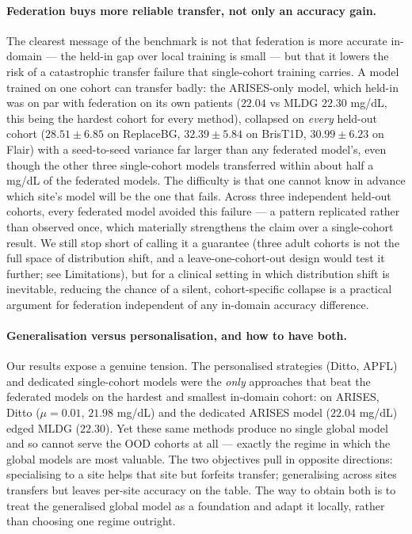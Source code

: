 \documentclass[10pt,letterpaper]{article}
\begin{document}
\paragraph{Federation buys more reliable transfer, not only an accuracy gain.}
The clearest message of the benchmark is not that federation is more accurate
in-domain --- the held-in gap over local training is small --- but that it
lowers the risk of a catastrophic transfer failure that single-cohort training
carries. A model trained on one cohort can transfer badly: the ARISES-only
model, which held-in was on par with federation on its own patients ($22.04$ vs
MLDG $22.30$ mg/dL, this being the hardest cohort for every method), collapsed on
\emph{every} held-out cohort ($28.51 \pm 6.85$ on ReplaceBG, $32.39 \pm 5.84$ on
BrisT1D, $30.99 \pm 6.23$ on Flair) with a seed-to-seed variance far larger than
any federated model's, even though the other three single-cohort models
transferred within about half a mg/dL of the federated models. The difficulty is
that one cannot know in advance which site's model will be the one that fails.
Across three independent held-out cohorts, every federated model avoided this
failure --- a pattern replicated rather than observed once, which materially
strengthens the claim over a single-cohort result. We still stop short of calling
it a guarantee (three adult cohorts is not the full space of distribution shift,
and a leave-one-cohort-out design would test it further; see Limitations), but
for a clinical setting in which distribution shift is inevitable, reducing the
chance of a silent, cohort-specific collapse is a practical argument for
federation independent of any in-domain accuracy difference.

\paragraph{Generalisation versus personalisation, and how to have both.} Our
results expose a genuine tension. The personalised strategies (Ditto, APFL) and
dedicated single-cohort models were the \emph{only} approaches that beat the
federated models on the hardest and smallest in-domain cohort: on ARISES, Ditto
($\mu{=}0.01$, $21.98$ mg/dL) and the dedicated ARISES model ($22.04$ mg/dL) edged
MLDG ($22.30$). Yet these same methods produce no single global model and so
cannot serve the OOD cohorts at all --- exactly the regime in which the global
models are most valuable. The two objectives pull in opposite directions:
specialising to a site helps that site but forfeits transfer; generalising across
sites transfers but leaves per-site accuracy on the table. The way to obtain both
is to treat the generalised global model as a foundation and adapt it locally,
rather than choosing one regime outright.
\end{document}
